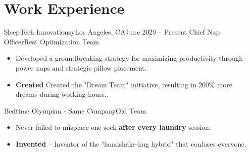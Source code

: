 \section{Work Experience}
  \resumeSubHeadingListStart

     \resumeSubheadingWork
      {SleepTech Innovationsy}{\hspace{-6em}Los Angeles, CA}{June 2029 -- Present}
      { Chief Nap Officer}{Rest Optimization Team}
      \begin{itemize}[label=\textbf{$\bullet$}]
        \setlength{\itemsep}{-0.15em} %
        \item{Developed a groundbreaking strategy for maximizing productivity through power naps and strategic pillow placement.}
        \item{\textbf{Created} Created the "Dream Team" initiative, resulting in 200\% more dreams during working hours..}
      \end{itemize}

      \vspace{-3.1em}

     \resumeSubheadingWork
      {}{}{}
      {Bedtime Olympian - Same Company}{Old Team}
      \begin{itemize}[label=\textbf{$\bullet$}]
        \setlength{\itemsep}{-0.15em} %
        \item{Never failed to misplace one sock \textbf{after every laundry} session.}
        \item{\textbf{Invented} – Inventor of the "handshake-hug hybrid" that confuses everyone.}
        \end{itemize}

      \vspace{-1.5em}

